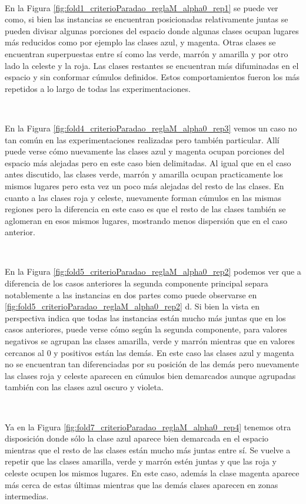 \documentclass[informe.tex]{subfiles}
\begin{document}
	~
	
	En la Figura \ref{fig:fold1_criterioParadao_reglaM_alpha0_rep1} se puede ver como, si bien las instancias se encuentran posicionadas relativamente juntas se pueden divisar algunas porciones del espacio donde algunas clases ocupan lugares m\'as reducidos como por ejemplo las clases azul, y magenta. Otras clases se encuentran superpuestas entre sí como las verde, marrón y amarilla y por otro lado la celeste y la roja. Las clases restantes se encuentran más difuminadas en el espacio y sin conformar cúmulos definidos. Estos comportamientos fueron los más repetidos a lo largo de todas las experimentaciones.
	
	~
	
	En la Figura \ref{fig:fold4_criterioParadao_reglaM_alpha0_rep3} vemos un caso no tan común en las experimentaciones realizadas pero también particular. Allí puede verse cómo nuevamente las clases azul y magenta ocupan porciones del espacio más alejadas pero en este caso bien delimitadas. Al igual que en el caso antes discutido, las clases verde, marrón y amarilla ocupan practicamente los mismos lugares pero esta vez un poco más alejadas del resto de las clases. En cuanto a las clases roja y celeste, nuevamente forman cúmulos en las mismas regiones pero la diferencia en este caso es que el resto de las clases también se aglomeran en esos mismos lugares, mostrando menos dispersión que en el caso anterior.
	
	~
	
	En la Figura \ref{fig:fold5_criterioParadao_reglaM_alpha0_rep2} podemos ver que a diferencia de los casos anteriores la segunda componente principal separa notablemente a las instancias en dos partes como puede observarse en \ref{fig:fold5_criterioParadao_reglaM_alpha0_rep2} d. Si bien la vista en perspectiva indica que todas las instancias están mucho más juntas que en los casos anteriores, puede verse cómo según la segunda componente, para valores negativos se agrupan las clases amarilla, verde y marrón mientras que en valores cercanos al 0 y positivos están las demás. En este caso las clases azul y magenta no se encuentran tan diferenciadas por su posición de las demás pero nuevamente las clases roja y celeste aparecen en cúmulos bien demarcados aunque agrupadas también con las clases azul oscuro y violeta. 
	
	~
	
	Ya en la Figura \ref{fig:fold7_criterioParadao_reglaM_alpha0_rep4} tenemos otra disposición donde sólo la clase azul aparece bien demarcada en el espacio mientras que el resto de las clases están mucho más juntas entre sí. Se vuelve a repetir que las clases amarilla, verde y marrón estén juntas y que las roja y celeste ocupen los mismos lugares. En este caso, además la clase magenta aparece más cerca de estas últimas mientras que las demás clases aparecen en zonas intermedias.
	
\end{document}
